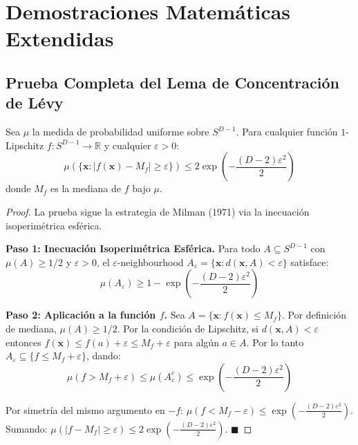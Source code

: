 \chapter{Demostraciones Matemáticas Extendidas}


\section{Prueba Completa del Lema de Concentración de Lévy}

\begin{lemma}
Sea $\mu$ la medida de probabilidad uniforme sobre $S^{D-1}$. Para cualquier función
$1$-Lipschitz $f: S^{D-1} \to \mathbb{R}$ y cualquier $\varepsilon > 0$:
\begin{equation}
\mu\left(\{ \mathbf{x} : |f(\mathbf{x}) - M_f| \ge \varepsilon \}\right) \le 2 \exp\!\left(-\frac{(D-2)\varepsilon^2}{2}\right)
\end{equation}
donde $M_f$ es la mediana de $f$ bajo $\mu$.
\end{lemma}

\begin{proof}
La prueba sigue la estrategia de Milman (1971) via la inecuación isoperimétrica esférica.

\textbf{Paso 1: Inecuación Isoperimétrica Esférica.}
Para todo $A \subseteq S^{D-1}$ con $\mu(A) \ge 1/2$ y $\varepsilon > 0$,
el $\varepsilon$-neighbourhood $A_\varepsilon = \{\mathbf{x} : d(\mathbf{x}, A) < \varepsilon\}$ satisface:
\begin{equation}
\mu(A_\varepsilon) \ge 1 - \exp\!\left(-\frac{(D-2)\varepsilon^2}{2}\right)
\end{equation}

\textbf{Paso 2: Aplicación a la función $f$.}
Sea $A = \{\mathbf{x} : f(\mathbf{x}) \le M_f\}$. Por definición de mediana, $\mu(A) \ge 1/2$.
Por la condición de Lipschitz, si $d(\mathbf{x}, A) < \varepsilon$ entonces
$f(\mathbf{x}) \le f(a) + \varepsilon \le M_f + \varepsilon$ para algún $a \in A$.
Por lo tanto $A_\varepsilon \subseteq \{f \le M_f + \varepsilon\}$, dando:
\begin{equation}
\mu(f > M_f + \varepsilon) \le \mu(A_\varepsilon^c) \le \exp\!\left(-\frac{(D-2)\varepsilon^2}{2}\right)
\end{equation}

Por simetría del mismo argumento en $-f$: $\mu(f < M_f - \varepsilon) \le \exp(-\frac{(D-2)\varepsilon^2}{2})$.
Sumando: $\mu(|f - M_f| \ge \varepsilon) \le 2\exp(-\frac{(D-2)\varepsilon^2}{2})$. $\blacksquare$
\end{proof}

